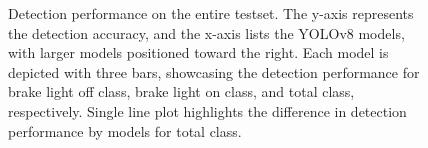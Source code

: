 \begin{figure}[t]%


\caption{Detection performance on the entire testset. The y-axis represents the detection accuracy, and the x-axis lists the YOLOv8 models, with larger models positioned toward the right. Each model is depicted with three bars, showcasing the detection performance for brake light off class, brake light on class, and total class, respectively. Single line plot highlights the difference in detection performance by models for total class.}
\label{fig:test_results}%
\end{figure}

